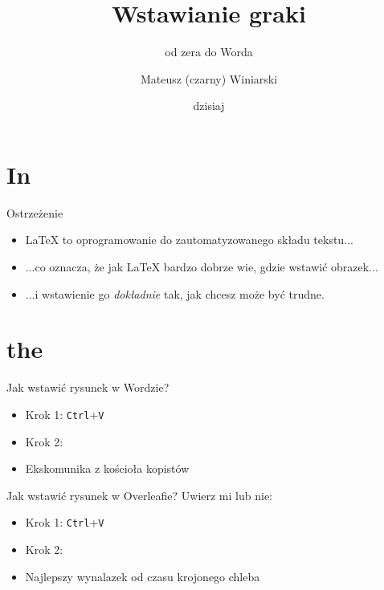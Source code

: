 \documentclass[handout]{beamer}
\title{Wstawianie gra\varphi{}ki}
\subtitle{od zera do Worda}
\author[M. Winiarski]{Mateusz (czarny) Winiarski}
\institute[KMPS UJ]{KMPS UJ, WFAIS}
\date[dzisiaj]{dzisiaj}
\begin{document}
\section{In}
\frame{\titlepage}

\begin{frame}{Ostrzeżenie}{}
\begin{itemize}[<+->]
    \item \LaTeX{} to oprogramowanie do zautomatyzowanego składu tekstu...
    \item ...co oznacza, że jak \LaTeX{} bardzo dobrze wie, gdzie wstawić obrazek...
    \item ...i wstawienie go \emph{dokładnie} tak, jak chcesz może być trudne.
\end{itemize}    
\end{frame}

\section{the}

\begin{frame}{Jak wstawić rysunek w Wordzie?}
\Large
\begin{itemize}[<+->]
    \item Krok 1: \texttt{Ctrl}+\texttt{V}
    \item Krok 2: 
    \item Ekskomunika z kościoła kopistów
\end{itemize}
    
\end{frame}

\begin{frame}{Jak wstawić rysunek w Overleafie?}
\Large
Uwierz mi lub nie:
\begin{itemize}[<+->]
    \item Krok 1: \texttt{Ctrl}+\texttt{V}
    \item Krok 2: 
    \item Najlepszy wynalazek od czasu krojonego chleba
\end{itemize}

    
\end{frame}
\end{document}
